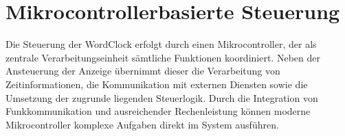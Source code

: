 \section{Mikrocontrollerbasierte Steuerung}
Die Steuerung der WordClock erfolgt durch einen Mikrocontroller, der als zentrale Verarbeitungseinheit sämtliche Funktionen koordiniert. 
Neben der Ansteuerung der Anzeige übernimmt dieser die Verarbeitung von Zeitinformationen, die Kommunikation mit externen Diensten sowie die Umsetzung der zugrunde liegenden Steuerlogik. 
Durch die Integration von Funkkommunikation und ausreichender Rechenleistung können moderne Mikrocontroller komplexe Aufgaben direkt im System ausführen. 
